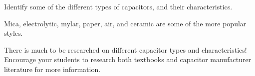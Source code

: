 

Identify some of the different types of capacitors, and their characteristics.







Mica, electrolytic, mylar, paper, air, and ceramic are some of the more popular styles.







There is much to be researched on different capacitor types and characteristics!  Encourage your students to research both textbooks and capacitor manufacturer literature for more information.




